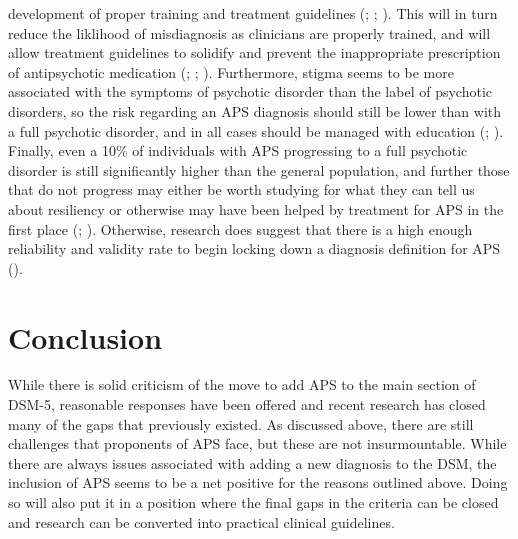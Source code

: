 \documentclass[stu,a4paper,12pt,donotrepeattitle]{apa7}
\begin{document}
development of proper training and treatment guidelines (\cite{carp20};
\cite{corcetal21}; \cite{zachetal20}). This will in turn reduce the liklihood
of misdiagnosis as clinicians are properly trained, and will allow treatment
guidelines to solidify and prevent the inappropriate prescription of
antipsychotic medication (\cite{carp20}; \cite{corcetal21}; \cite{zachetal20}).
Furthermore, stigma seems to be more associated with the symptoms of psychotic
disorder than the label of psychotic disorders, so the risk regarding an APS
diagnosis should still be lower than with a full psychotic disorder, and in all
cases should be managed with education (\cite{carp20}; \cite{corcetal21}).
Finally, even a 10\% of individuals with APS progressing to a full psychotic
disorder is still significantly higher than the general population, and further
those that do not progress may either be worth studying for what they can tell us
about resiliency or otherwise may have been helped by treatment for APS in the
first place (\cite{carp20}; \cite{corcetal21}). Otherwise, research does
suggest that there is a high enough reliability and validity rate to begin
locking down a diagnosis definition for APS (\cite{rabetal20}).
\section{Conclusion}
While there is solid criticism of the move to add APS to the main section of
DSM-5, reasonable responses have been offered and recent research has closed
many of the gaps that previously existed. As discussed above, there are still
challenges that proponents of APS face, but these are not insurmountable. While
there are always issues associated with adding a new diagnosis to the DSM,
the inclusion of APS seems to be a net positive for the reasons outlined above.
Doing so will also put it in a position where the final gaps in the criteria
can be closed and research can be converted into practical clinical guidelines.
\newpage
\printbibliography
\end{document}
